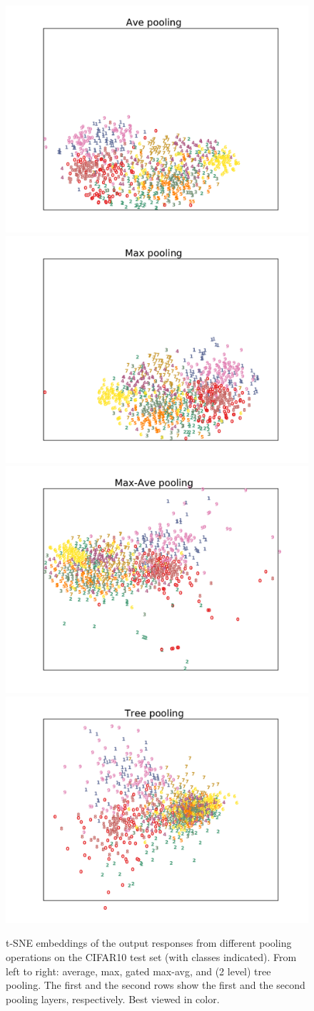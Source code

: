 \documentclass[twoside]{article}
\begin{document}
\begin{figure}[!htp]
\begin{center}
\includegraphics[width=0.235\linewidth]{fig/ave_pool2}  
\includegraphics[width=0.235\linewidth]{fig/max_pool2} 
\includegraphics[width=0.235\linewidth]{fig/max_ave_pool2} 
\includegraphics[width=0.235\linewidth]{fig/tree_pool2}
\end{center}
\caption{t-SNE embeddings of the output responses from different pooling operations on
the CIFAR10 test set (with classes indicated). From left to right: average, max,
gated max-avg, and (2 level) tree pooling. The first and the second rows show the
first and the second pooling layers, respectively. Best viewed in color.}
\label{fig-embedding}
\end{figure}
\end{document}
